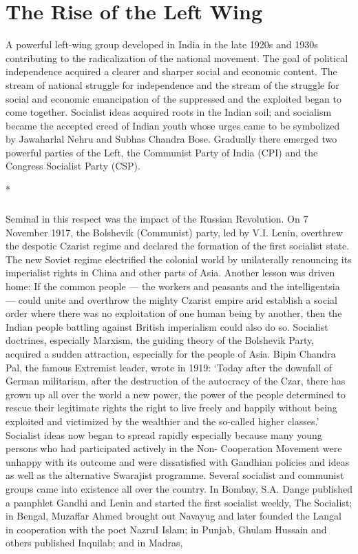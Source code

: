 
\chapter{The Rise of the Left Wing}



A powerful left-wing group developed in India in the late 1920s and 1930s contributing to the radicalization of the national movement. The goal of political independence acquired a clearer and sharper social and economic content. The stream of national struggle for independence and the stream of the struggle for social and economic emancipation of the suppressed and the exploited began to come together. Socialist ideas acquired roots in the Indian soil; and socialism became the accepted creed of Indian youth whose urges came to be symbolized by Jawaharlal Nehru and Subhas Chandra Bose. Gradually there emerged two powerful parties of the Left, the Communist Party of India (CPI) and the Congress Socialist Party (CSP).

\begin{center}*\end{center}

\paragraph*{}


Seminal in this respect was the impact of the Russian Revolution. On 7 November 1917, the Bolshevik (Communist) party, led by V.I. Lenin, overthrew the despotic Czarist regime and declared the formation of the first socialist state. The new Soviet regime electrified the colonial world by unilaterally renouncing its imperialist rights in China and other parts of Asia. Another lesson was driven home: If the common people — the workers and peasants and the intelligentsia — could unite and overthrow the mighty Czarist empire arid establish a social order where there was no exploitation of one human being by another, then the Indian people battling against British imperialism could also do so. Socialist doctrines, especially Marxism, the guiding theory of the Bolshevik Party, acquired a sudden attraction, especially for the people of Asia. Bipin Chandra Pal, the famous Extremist leader, wrote in 1919: `Today after the downfall of German militarism, after the destruction of the autocracy of the Czar, there has grown up all over the world a new power, the power of the people determined to rescue their legitimate rights the right to live freely and happily without being exploited and victimized by the wealthier and the so-called higher classes.' Socialist ideas now began to spread rapidly especially because many young persons who had participated actively in the Non- Cooperation Movement were unhappy with its outcome and were dissatisfied with Gandhian policies and ideas as well as the alternative Swarajist programme. Several socialist and communist groups came into existence all over the country. In Bombay, S.A. Dange published a pamphlet Gandhi and Lenin and started the first socialist weekly, The Socialist; in Bengal, Muzaffar Ahmed brought out Navayug and later founded the Langal in cooperation with the poet NazruI Islam; in Punjab, Ghulam Hussain and others published Inquilab; and in Madras, 


